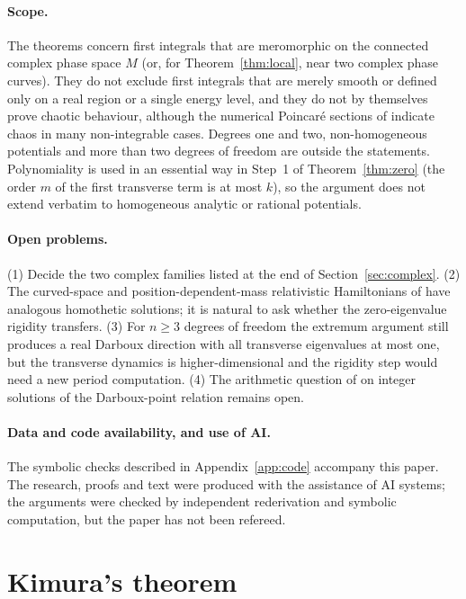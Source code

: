 \documentclass[11pt]{article}
\numberwithin{equation}{section}
\theoremstyle{definition}
\theoremstyle{remark}
\begin{document}
\paragraph{Scope.}
The theorems concern first integrals that are meromorphic on the connected complex phase space $M$ (or, for
Theorem~\ref{thm:local}, near two complex phase curves). They do not exclude first integrals that are merely smooth
or defined only on a real region or a single energy level, and they do not by themselves prove chaotic behaviour,
although the numerical Poincar\'e sections of \cite{PSM23} indicate chaos in many non-integrable cases. Degrees one
and two, non-homogeneous potentials and more than two degrees of freedom are outside the statements. Polynomiality is
used in an essential way in Step~1 of Theorem~\ref{thm:zero} (the order $m$ of the first transverse term is at most
$k$), so the argument does not extend verbatim to homogeneous analytic or rational potentials.

\paragraph{Open problems.}
(1) Decide the two complex families listed at the end of Section~\ref{sec:complex}. (2) The curved-space and
position-dependent-mass relativistic Hamiltonians of \cite{SP25} have analogous homothetic solutions; it is natural to
ask whether the zero-eigenvalue rigidity transfers. (3) For $n\ge3$ degrees of freedom the extremum argument still
produces a real Darboux direction with all transverse eigenvalues at most one, but the transverse dynamics is
higher-dimensional and the rigidity step would need a new period computation. (4) The arithmetic question of
\cite[Sec.~VI]{PSM23} on integer solutions of the Darboux-point relation remains open.

\paragraph{Data and code availability, and use of AI.}
The symbolic checks described in Appendix~\ref{app:code} accompany this paper. The research, proofs and text were
produced with the assistance of AI systems; the arguments were checked by independent rederivation and symbolic
computation, but the paper has not been refereed.

\appendix
\section{Kimura's theorem}\label{app:kimura}
\end{document}
